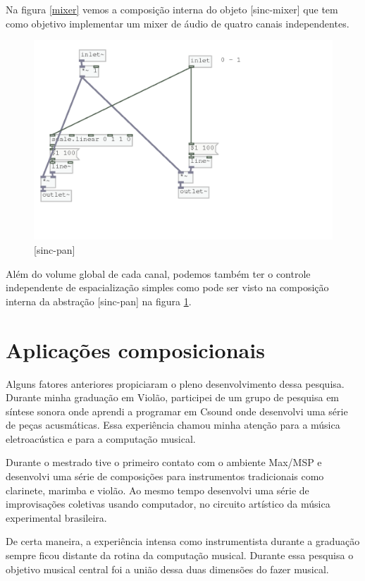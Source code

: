 \documentclass{ppgmus}
\begin{document}
Na figura \ref{mixer} vemos a composição interna do objeto
[sinc-mixer] que tem como objetivo implementar um mixer
de áudio de quatro canais independentes.

\begin{figure}
\includegraphics[scale=.6]{pan}
\caption{[sinc-pan]}
\label{pan}
\end{figure}

Além do volume global de cada canal, podemos também ter o controle
independente de espacialização simples como pode ser visto
na composição interna da abstração [sinc-pan] na figura \ref{pan}.

\chapter{Aplicações composicionais}
\label{composicao}

Alguns fatores anteriores propiciaram o pleno desenvolvimento
dessa pesquisa. Durante minha graduação em Violão, participei
de um grupo de pesquisa em síntese sonora onde aprendi a programar
em Csound onde desenvolvi uma série de peças acusmáticas. 
Essa experiência chamou minha atenção para a música
eletroacústica e para a computação musical. 

Durante o mestrado tive o primeiro contato com o ambiente
Max/MSP e desenvolvi uma série de composições para instrumentos
tradicionais como clarinete, marimba e violão. Ao mesmo tempo
desenvolvi uma série de improvisações coletivas usando computador,
no circuito artístico da música experimental brasileira.

De certa maneira, a experiência intensa como instrumentista
durante a graduação sempre ficou distante da rotina da
computação musical. Durante essa pesquisa o objetivo musical central 
foi a união dessa duas dimensões do fazer musical.
\end{document}
